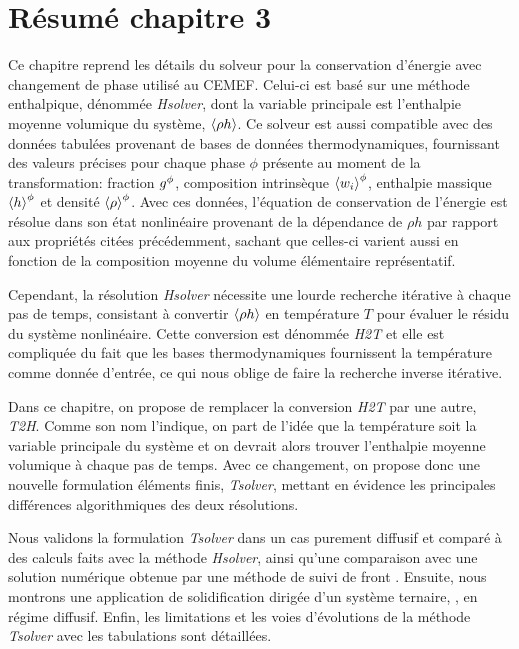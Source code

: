 \clearpage
\section*{Résumé chapitre 3}

Ce chapitre reprend les détails du solveur pour la conservation d'énergie avec changement de phase utilisé au CEMEF.
Celui-ci est basé sur une méthode enthalpique, dénommée \emph{Hsolver}, dont la variable principale est l'enthalpie
moyenne volumique du système, $\left \langle \rho h \right \rangle$. Ce solveur est aussi compatible avec des données tabulées provenant de bases de données
thermodynamiques, fournissant des valeurs précises pour chaque phase $\phi$ présente au moment de la transformation: 
fraction ${g^{\phi}} $, composition intrinsèque $\left \langle w_i \right \rangle^\phi$, enthalpie massique $\left \langle h \right \rangle^{\phi} $ et densité $\left \langle \rho \right \rangle^{\phi} $. 
Avec ces données, l'équation de conservation de l'énergie est résolue dans son état nonlinéaire 
provenant de la dépendance de $\rho h$ par rapport aux propriétés citées précédemment, sachant que celles-ci varient
aussi en fonction de la composition moyenne du volume élémentaire représentatif.


Cependant, la résolution \emph{Hsolver} nécessite une lourde recherche itérative à chaque pas de temps, consistant à convertir
$\left \langle \rho h \right \rangle$ en température $T$ pour évaluer le résidu du système nonlinéaire. Cette conversion est dénommée \emph{H2T} et elle est
compliquée du fait que les bases thermodynamiques fournissent la température comme donnée d'entrée, ce qui nous oblige de faire 
la recherche inverse itérative.


Dans ce chapitre, on propose de remplacer la conversion \emph{H2T} par une autre, \emph{T2H}. Comme son nom l'indique,
on part de l'idée que la température soit la variable principale du système et on devrait alors trouver l'enthalpie moyenne volumique
à chaque pas de temps. Avec ce changement, on propose donc une nouvelle formulation éléments finis, \emph{Tsolver}, mettant en évidence les principales
différences algorithmiques des deux résolutions.


Nous validons la formulation \emph{Tsolver} dans un cas purement diffusif et comparé à des calculs faits avec la méthode \emph{Hsolver}, 
ainsi qu'une comparaison avec une solution numérique obtenue par une méthode de suivi de front \citep{gandin_constrained_2000}.
Ensuite, nous montrons une application de solidification dirigée d'un système ternaire, , en régime diffusif.
Enfin, les limitations et les voies d'évolutions de la méthode \emph{Tsolver} avec les tabulations sont détaillées.
